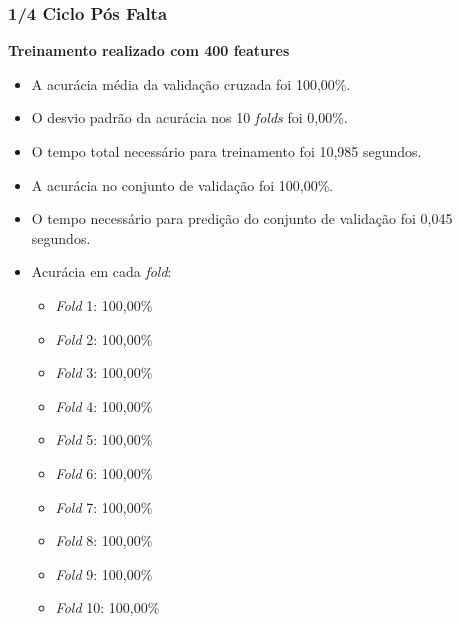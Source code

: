 \subsubsection{1/4 Ciclo Pós Falta}
\textbf{Treinamento realizado com 400 features}
\begin{itemize}
    \item A acurácia média da validação cruzada foi 100,00\%.
    \item O desvio padrão da acurácia nos 10 \textit{folds} foi 0,00\%.
    \item O tempo total necessário para treinamento foi 10,985 segundos.
    \item A acurácia no conjunto de validação foi 100,00\%.
    \item O tempo necessário para predição do conjunto de validação foi 0,045 segundos.
    \item Acurácia em cada \textit{fold}:
    \begin{itemize}
        \item \textit{Fold} 1: 100,00\%
        \item \textit{Fold} 2: 100,00\%
        \item \textit{Fold} 3: 100,00\%
        \item \textit{Fold} 4: 100,00\%
        \item \textit{Fold} 5: 100,00\%
        \item \textit{Fold} 6: 100,00\%
        \item \textit{Fold} 7: 100,00\%
        \item \textit{Fold} 8: 100,00\%
        \item \textit{Fold} 9: 100,00\%
        \item \textit{Fold} 10: 100,00\%
    \end{itemize}
\end{itemize}

